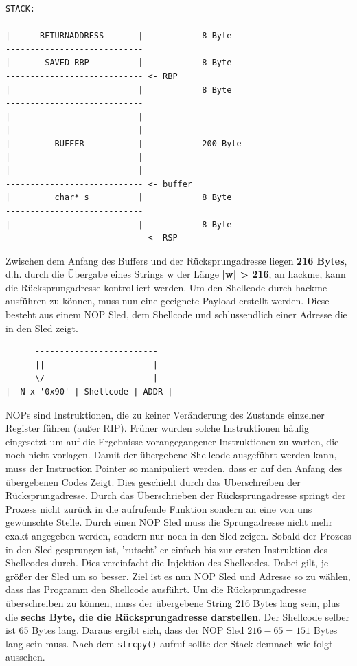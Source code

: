 \documentclass[12pt]{article}
\begin{document}
\begin{lstlisting}
STACK:
----------------------------
|      RETURNADDRESS       |            8 Byte 
----------------------------
|       SAVED RBP          |            8 Byte
---------------------------- <- RBP
|                          |            8 Byte
----------------------------
|                          |
|                          |
|         BUFFER           |            200 Byte
|                          |
|                          |
---------------------------- <- buffer
|         char* s          |            8 Byte
----------------------------
|                          |            8 Byte
---------------------------- <- RSP
\end{lstlisting}
Zwischen dem Anfang des Buffers und der Rücksprungadresse liegen \textbf{216 Bytes}, d.h. durch die Übergabe eines Strings w der Länge \textbf{|w| > 216}, an hackme, kann die Rücksprungadresse kontrolliert werden.
\newline
\newline
\newline
Um den Shellcode durch hackme ausführen zu können, muss nun eine geeignete Payload erstellt werden. Diese besteht aus einem NOP Sled, dem Shellcode und schlussendlich einer Adresse die in den Sled zeigt.
\begin{lstlisting}
      -------------------------
      ||                      |
      \/                      |
|  N x '0x90' | Shellcode | ADDR |
\end{lstlisting}
NOPs sind Instruktionen, die zu keiner Veränderung des Zustands einzelner Register führen (außer RIP). Früher wurden solche Instruktionen häufig eingesetzt um auf die Ergebnisse vorangegangener Instruktionen zu warten, die noch nicht vorlagen. Damit der übergebene Shellcode ausgeführt werden kann, muss der Instruction Pointer so manipuliert werden, dass er auf den Anfang des übergebenen Codes Zeigt. Dies geschieht durch das Überschreiben der Rücksprungadresse. Durch das Überschrieben der Rücksprungadresse springt der Prozess nicht zurück in die aufrufende Funktion sondern an eine von uns gewünschte Stelle. Durch einen NOP Sled muss die Sprungadresse nicht mehr exakt angegeben werden, sondern nur noch in den Sled zeigen. Sobald der Prozess in den Sled gesprungen ist, 'rutscht' er einfach bis zur ersten Instruktion des Shellcodes durch. Dies vereinfacht die Injektion des Shellcodes. Dabei gilt, je größer der Sled um so besser.
Ziel ist es nun NOP Sled und Adresse so zu wählen, dass das Programm den Shellcode ausführt. 
\newline
\newline
Um die Rücksprungadresse überschreiben zu können, muss der übergebene String 216 Bytes lang sein, plus die \textbf{sechs Byte, die die Rücksprungadresse darstellen}. Der Shellcode selber ist 65 Bytes lang.
Daraus ergibt sich, dass der NOP Sled $ 216 - 65 = 151 $ Bytes lang sein muss. Nach dem \texttt{strcpy()} aufruf sollte der Stack demnach wie folgt aussehen.
\end{document}
